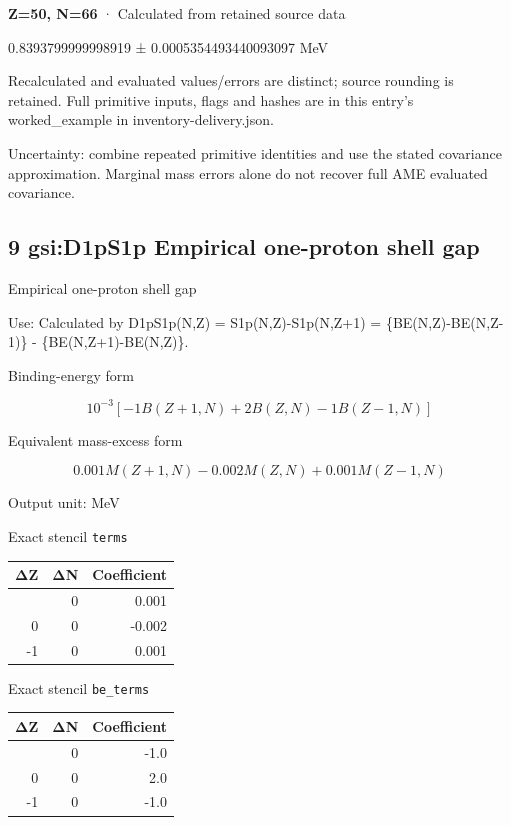 \documentclass[
  11pt,
  letterpaper,
]{article}
\begin{document}
\textbf{Z=50, N=66} · Calculated from retained source data

0.8393799999998919 ± 0.0005354493440093097 MeV

Recalculated and evaluated values/errors are distinct; source rounding
is retained. Full primitive inputs, flags and hashes are in this entry's
worked\_example in inventory-delivery.json.

Uncertainty: combine repeated primitive identities and use the stated
covariance approximation. Marginal mass errors alone do not recover full
AME evaluated covariance.

\subsection{9 gsi:D1pS1p Empirical one-proton shell
gap}\label{gsid1ps1p-empirical-one-proton-shell-gap}

Empirical one-proton shell gap

Use: Calculated by D1pS1p(N,Z) = S1p(N,Z)-S1p(N,Z+1) =
\{BE(N,Z)-BE(N,Z-1)\} - \{BE(N,Z+1)-BE(N,Z)\}.

Binding-energy form

\[
10^{-3}[-1B(Z+1,N)+2B(Z,N)-1B(Z-1,N)]
\]

Equivalent mass-excess form

\[
0.001M(Z+1,N)-0.002M(Z,N)+0.001M(Z-1,N)
\]

Output unit: MeV

Exact stencil \texttt{terms}

\begin{longtable}[]{@{}rrr@{}}
\toprule\noalign{}
ΔZ & ΔN & Coefficient \\
\midrule\noalign{}
\endhead
\bottomrule\noalign{}
\endlastfoot
1 & 0 & 0.001 \\
0 & 0 & -0.002 \\
-1 & 0 & 0.001 \\
\end{longtable}

Exact stencil \texttt{be\_terms}

\begin{longtable}[]{@{}rrr@{}}
\toprule\noalign{}
ΔZ & ΔN & Coefficient \\
\midrule\noalign{}
\endhead
\bottomrule\noalign{}
\endlastfoot
1 & 0 & -1.0 \\
0 & 0 & 2.0 \\
-1 & 0 & -1.0 \\
\end{longtable}
\end{document}
